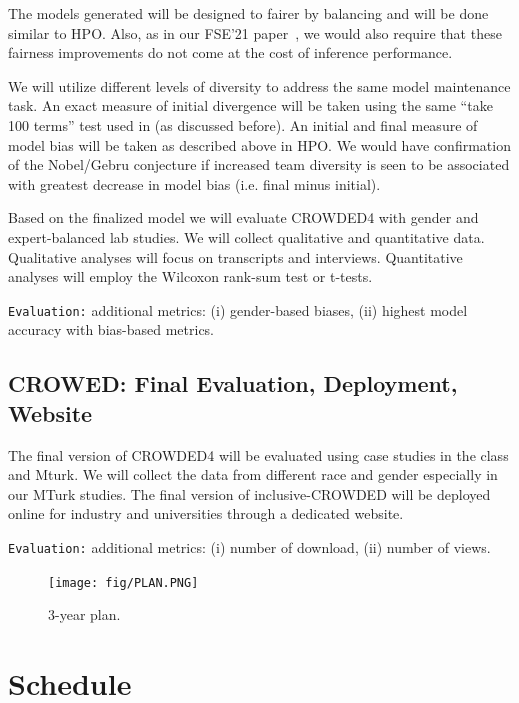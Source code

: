 The models generated will be designed to fairer by balancing and will be done similar to HPO. Also, as in our FSE'21 paper~\cite{fse21}, we would also require that these
 fairness improvements do not come at the cost of inference performance.
 
We will utilize different levels of diversity to address the same model maintenance task. An exact measure of initial divergence will be taken using the same ``take 100 terms'' test used in (as discussed before). An initial and final measure of model bias will be taken as described above in HPO. We would have confirmation of the  Nobel/Gebru conjecture if increased team diversity is seen to be associated with greatest decrease in model bias (i.e. final minus initial).

Based on the finalized model we will evaluate CROWDED4 with gender and expert-balanced lab studies. We will collect qualitative and quantitative data.  Qualitative analyses will focus on transcripts and interviews. Quantitative analyses will employ the Wilcoxon rank-sum test or t-tests.

{\tt Evaluation:} additional metrics: (i) gender-based biases, (ii) highest model accuracy with bias-based metrics.

\subsection{CROWED: Final Evaluation, Deployment, Website}
The final version of CROWDED4 will be evaluated using case studies in the class and Mturk. We will collect the data from different race and gender especially in our MTurk studies. The final version of inclusive-CROWDED will be deployed online for industry and universities through a dedicated website. 

{\tt Evaluation:} additional metrics: (i) number of download, (ii) number of views.



\begin{figure}[t]
\centerline{\texttt{[image: fig/PLAN.PNG]}}
\caption{3-year plan.}
\label{Overall}
\end{figure}



\section{Schedule} 


